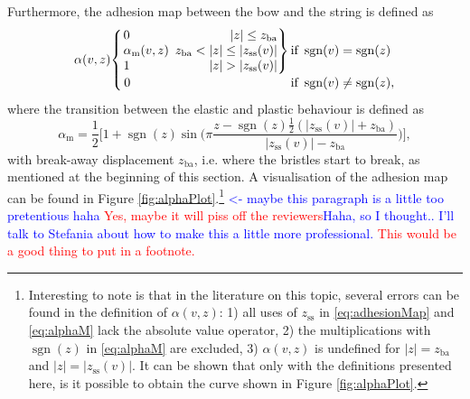 \documentclass[twoside,a4paper]{article}
\newenvironment{rcases}
  {\left.\begin{alignedat}{2}}
  {\end{alignedat}\right\rbrace}
\DeclareMathOperator{\sgn}{sgn}
\def\SBcomment[#1]{\textcolor{Red}{#1}}
\def\SWcomment[#1]{\textcolor{Blue}{#1}}
\begin{document}
Furthermore, the adhesion map between the bow and the string is defined as
\begin{equation}\label{eq:adhesionMap}
\alpha(v, z) 
\begin{aligned}
    \begin{cases}
    \begin{rcases}
        &0 & |z| \leq z_\text{ba}\\
       &\alpha_\text{m}(v,z)&\ \, z_\text{ba}<|z|\leq|z_\text{ss}(v)|\\        &1 &|z|>|z_\text{ss}(v)|
        \end{rcases} 
        
        &\!\!\!\!\!\text{if}\  \sgn(v)=\sgn(z)\\
        \,0&\!\!\!\!\!\text{if}\  \sgn(v)\neq\sgn(z),
    \end{cases}
    \end{aligned}
\end{equation}
where the transition between the elastic and plastic behaviour is defined as
\begin{equation}\label{eq:alphaM}
    \alpha_\text{m} = \frac{1}{2}\bigg[1+\sgn(z)\sin\bigg(\pi\frac{z-\sgn(z)\frac{1}{2}(|z_\text{ss}(v)|+z_\text{ba})}{|z_\text{ss}(v)|-z_\text{ba}}\bigg)\bigg],
\end{equation}
with break-away displacement $z_\text{ba}$, i.e. where the bristles start to break, as mentioned at the beginning of this section. A visualisation of the adhesion map can be found in Figure \ref{fig:alphaPlot}.\footnote{Interesting to note is that in the literature on this topic, several errors can be found in the definition of $\alpha(v,z)$: 1) all uses of $z_\text{ss}$ in \eqref{eq:adhesionMap} and \eqref{eq:alphaM} lack the absolute value operator, 2) the multiplications with $\sgn(z)$ in \eqref{eq:alphaM} are excluded, 3) $\alpha(v,z)$ is undefined for $|z|=z_\text{ba}$ and $|z|=|z_\text{ss}(v)|$. It can be shown that only with the definitions presented here, is it possible to obtain the curve shown in Figure \ref{fig:alphaPlot}.} \SWcomment[<- maybe this paragraph is a little too pretentious haha ]\SBcomment[Yes, maybe it will piss off the reviewers]\SWcomment[Haha, so I thought.. I'll talk to Stefania about how to make this a little more professional. ]\SBcomment[This would be a good thing to put in a footnote.]
\end{document}
